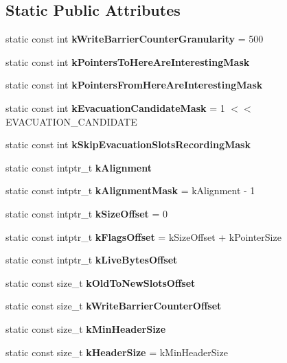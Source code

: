 \subsection*{Static Public Attributes}
\begin{DoxyCompactItemize}
\item 
static const int {\bfseries k\+Write\+Barrier\+Counter\+Granularity} = 500\hypertarget{classv8_1_1internal_1_1_memory_chunk_a9294579ffbc1f7cde026a740e13e1af2}{}\label{classv8_1_1internal_1_1_memory_chunk_a9294579ffbc1f7cde026a740e13e1af2}

\item 
static const int {\bfseries k\+Pointers\+To\+Here\+Are\+Interesting\+Mask}
\item 
static const int {\bfseries k\+Pointers\+From\+Here\+Are\+Interesting\+Mask}
\item 
static const int {\bfseries k\+Evacuation\+Candidate\+Mask} = 1 $<$$<$ E\+V\+A\+C\+U\+A\+T\+I\+O\+N\+\_\+\+C\+A\+N\+D\+I\+D\+A\+TE\hypertarget{classv8_1_1internal_1_1_memory_chunk_a3351831113c80aaa9f987bb46d0c2bf5}{}\label{classv8_1_1internal_1_1_memory_chunk_a3351831113c80aaa9f987bb46d0c2bf5}

\item 
static const int {\bfseries k\+Skip\+Evacuation\+Slots\+Recording\+Mask}
\item 
static const intptr\+\_\+t {\bfseries k\+Alignment}
\item 
static const intptr\+\_\+t {\bfseries k\+Alignment\+Mask} = k\+Alignment -\/ 1\hypertarget{classv8_1_1internal_1_1_memory_chunk_aacbc80f7e6ca4f243c9b31dc2d5fd6e8}{}\label{classv8_1_1internal_1_1_memory_chunk_aacbc80f7e6ca4f243c9b31dc2d5fd6e8}

\item 
static const intptr\+\_\+t {\bfseries k\+Size\+Offset} = 0\hypertarget{classv8_1_1internal_1_1_memory_chunk_a92f3178835a10fa2ad862528a91f1e66}{}\label{classv8_1_1internal_1_1_memory_chunk_a92f3178835a10fa2ad862528a91f1e66}

\item 
static const intptr\+\_\+t {\bfseries k\+Flags\+Offset} = k\+Size\+Offset + k\+Pointer\+Size\hypertarget{classv8_1_1internal_1_1_memory_chunk_ad9720790421c6b7c580b9296f75dadc1}{}\label{classv8_1_1internal_1_1_memory_chunk_ad9720790421c6b7c580b9296f75dadc1}

\item 
static const intptr\+\_\+t {\bfseries k\+Live\+Bytes\+Offset}
\item 
static const size\+\_\+t {\bfseries k\+Old\+To\+New\+Slots\+Offset}
\item 
static const size\+\_\+t {\bfseries k\+Write\+Barrier\+Counter\+Offset}
\item 
static const size\+\_\+t {\bfseries k\+Min\+Header\+Size}
\item 
static const size\+\_\+t {\bfseries k\+Header\+Size} = k\+Min\+Header\+Size\hypertarget{classv8_1_1internal_1_1_memory_chunk_a9d854e2a69023012cd6c1f2a811ed3a2}{}\label{classv8_1_1internal_1_1_memory_chunk_a9d854e2a69023012cd6c1f2a811ed3a2}


\end{DoxyCompactItemize}
